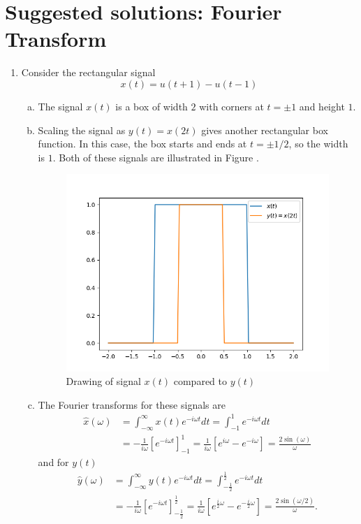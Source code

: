 \newpage
\section{Suggested solutions: Fourier Transform}
\begin{enumerate}
\item Consider the rectangular signal 
$$x(t)=u(t+1)-u(t-1)$$

\begin{enumerate}[a)]
\item The signal $x(t)$ is a box of width $2$ with corners at $t=\pm 1$ and height $1$. 

\item Scaling the signal as $y(t)=x(2t)$ gives another rectangular box function. In this case, the box starts and ends at $t=\pm 1/2$, so the width is $1$. Both of these signals are illustrated in Figure .

\begin{figure}
    \centering
    \includegraphics{ch08/figures/fig:ex8.1a.png}
    \caption{Drawing of signal $x(t)$ compared to $y(t)$}
    \label{fig:ex8.1a}
\end{figure}

\item The Fourier transforms for these signals are
\begin{align*}
    \hat{x}(\omega)&=\int_{-\infty}^{\infty}x(t)e^{-i\omega t}dt=\int_{-1}^{1}e^{-i\omega t}dt  \\
    &=-\frac{1}{i\omega}[e^{-i\omega t}]_{-1}^{1}=\frac{1}{i\omega}\left[e^{i\omega}-e^{-i\omega}\right]=\frac{2\sin(\omega)}{\omega}
\end{align*}
and for $y(t)$
\begin{align*}
    \hat{y}(\omega)&=\int_{-\infty}^{\infty}y(t)e^{-i\omega t}dt=\int_{-\frac{1}{2}}^{\frac{1}{2}}e^{-i\omega t}dt  \\
    &=-\frac{1}{i\omega}[e^{-i\omega t}]_{-\frac{1}{2}}^{\frac{1}{2}}=\frac{1}{i\omega}\left[e^{\frac{i}{2}\omega}-e^{-\frac{i}{2}\omega}\right]=\frac{2\sin(\omega/2)}{\omega}.
\end{align*}


\end{enumerate}
\end{enumerate}
